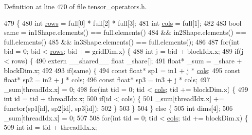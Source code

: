 Definition at line 470 of file tensor\+\_\+operators.\+h.


\begin{DoxyCode}
479                                              \{
480   \textcolor{keywordtype}{int} \hyperlink{namespacemarian_ace1e9a63d52edc363d70d661cf8d0257}{rows} = full[0] * full[2] * full[3];
481   \textcolor{keywordtype}{int} \hyperlink{namespacemarian_ab9fbdcc76cc853270094524572584222}{cols} = full[1];
482 
483   \textcolor{keywordtype}{bool} same = in1Shape.elements() == full.elements()
484               && in2Shape.elements() == full.elements()
485               && in3Shape.elements() == full.elements();
486 
487   \textcolor{keywordflow}{for}(\textcolor{keywordtype}{int} bid = 0; bid < \hyperlink{namespacemarian_ace1e9a63d52edc363d70d661cf8d0257}{rows}; bid += gridDim.x) \{
488     \textcolor{keywordtype}{int} j = bid + blockIdx.x;
489     \textcolor{keywordflow}{if}(j < rows) \{
490       \textcolor{keyword}{extern} \_\_shared\_\_ \textcolor{keywordtype}{float} \_share[];
491       \textcolor{keywordtype}{float}* \_sum = \_share + blockDim.x;
492 
493       \textcolor{keywordflow}{if}(same) \{
494         \textcolor{keyword}{const} \textcolor{keywordtype}{float}* sp1 = in1 + j * \hyperlink{namespacemarian_ab9fbdcc76cc853270094524572584222}{cols};
495         \textcolor{keyword}{const} \textcolor{keywordtype}{float}* sp2 = in2 + j * \hyperlink{namespacemarian_ab9fbdcc76cc853270094524572584222}{cols};
496         \textcolor{keyword}{const} \textcolor{keywordtype}{float}* sp3 = in3 + j * \hyperlink{namespacemarian_ab9fbdcc76cc853270094524572584222}{cols};
497         \_sum[threadIdx.x] = 0;
498         \textcolor{keywordflow}{for}(\textcolor{keywordtype}{int} tid = 0; tid < \hyperlink{namespacemarian_ab9fbdcc76cc853270094524572584222}{cols}; tid += blockDim.x) \{
499           \textcolor{keywordtype}{int} \textcolor{keywordtype}{id} = tid + threadIdx.x;
500           \textcolor{keywordflow}{if}(\textcolor{keywordtype}{id} < cols) \{
501             \_sum[threadIdx.x] += functor(sp1[\textcolor{keywordtype}{id}], sp2[\textcolor{keywordtype}{id}], sp3[\textcolor{keywordtype}{id}]);
502           \}
503         \}
504       \} \textcolor{keywordflow}{else} \{
505         \textcolor{keywordtype}{int} dims[4];
506         \_sum[threadIdx.x] = 0;
507 
508         \textcolor{keywordflow}{for}(\textcolor{keywordtype}{int} tid = 0; tid < \hyperlink{namespacemarian_ab9fbdcc76cc853270094524572584222}{cols}; tid += blockDim.x) \{
509           \textcolor{keywordtype}{int} \textcolor{keywordtype}{id} = tid + threadIdx.x;

\end{DoxyCode}
